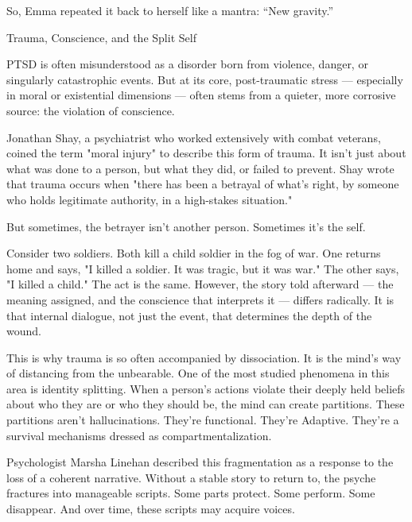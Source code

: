 So, Emma repeated it back to herself like a mantra: ``New gravity.''

\medskip

\begin{PsychologicalSidebar}{Trauma, Conscience, and the Split Self}

PTSD is often misunderstood as a disorder born from violence, danger, or singularly catastrophic 
events. But at its core, post-traumatic stress --- especially in moral or existential dimensions --- 
often stems from a quieter, more corrosive source: the violation of conscience.

\medskip

Jonathan Shay, a psychiatrist who worked extensively with combat veterans, coined the term 
"moral injury" to describe this form of trauma. It isn’t just about what was done to a person, but what 
they did, or failed to prevent. Shay wrote that trauma occurs when "there has been a betrayal of 
what’s right, by someone who holds legitimate authority, in a high-stakes situation."

\medskip


But sometimes, the betrayer isn’t another person. Sometimes it’s the self.

\medskip


Consider two soldiers. Both kill a child soldier in the fog of war. One returns home and says, "I 
killed a soldier. It was tragic, but it was war." The other says, "I killed a child." The act is the same. 
However, the story told afterward --- the meaning assigned, and the conscience that interprets it
--- differs radically. It is that internal dialogue, not just the event, that determines the depth 
of the wound.

\medskip


This is why trauma is so often accompanied by dissociation. It is the mind’s way of distancing from the 
unbearable. One of the most studied phenomena in this area is identity splitting. When a person's actions 
violate their deeply held beliefs about who they are or who they should be, the mind can create 
partitions. These partitions aren’t hallucinations. They’re functional. They're Adaptive. 
They're a survival mechanisms dressed as compartmentalization.

\medskip


Psychologist Marsha Linehan described this fragmentation as a response to the loss of a coherent 
narrative. Without a stable story to return to, the psyche fractures into manageable scripts. Some 
parts protect. Some perform. Some disappear. And over time, these scripts may acquire voices.


\end{PsychologicalSidebar}
